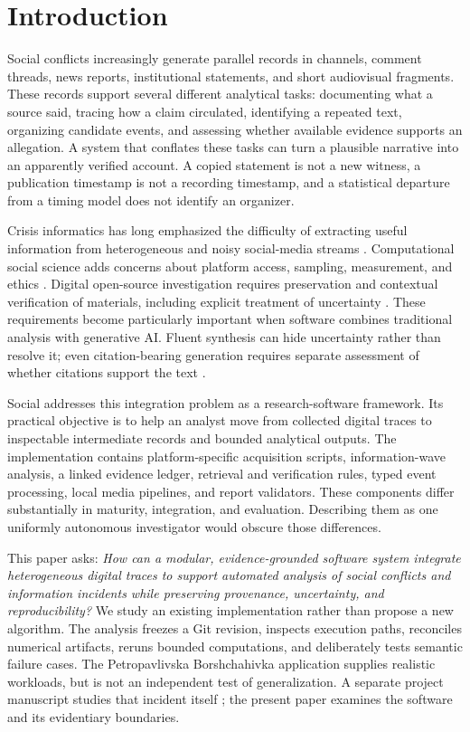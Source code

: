 \section{Introduction}
Social conflicts increasingly generate parallel records in channels, comment threads, news reports, institutional statements, and short audiovisual fragments. These records support several different analytical tasks: documenting what a source said, tracing how a claim circulated, identifying a repeated text, organizing candidate events, and assessing whether available evidence supports an allegation. A system that conflates these tasks can turn a plausible narrative into an apparently verified account. A copied statement is not a new witness, a publication timestamp is not a recording timestamp, and a statistical departure from a timing model does not identify an organizer.

Crisis informatics has long emphasized the difficulty of extracting useful information from heterogeneous and noisy social-media streams \citep{imran2015crisis}. Computational social science adds concerns about platform access, sampling, measurement, and ethics \citep{Olteanu2019,VicentePaula2023}. Digital open-source investigation requires preservation and contextual verification of materials, including explicit treatment of uncertainty \citep{berkeleyProtocol2022}. These requirements become particularly important when software combines traditional analysis with generative AI. Fluent synthesis can hide uncertainty rather than resolve it; even citation-bearing generation requires separate assessment of whether citations support the text \citep{gao2023alce}.

Social addresses this integration problem as a research-software framework. Its practical objective is to help an analyst move from collected digital traces to inspectable intermediate records and bounded analytical outputs. The implementation contains platform-specific acquisition scripts, information-wave analysis, a linked evidence ledger, retrieval and verification rules, typed event processing, local media pipelines, and report validators. These components differ substantially in maturity, integration, and evaluation. Describing them as one uniformly autonomous investigator would obscure those differences.

This paper asks: \emph{How can a modular, evidence-grounded software system integrate heterogeneous digital traces to support automated analysis of social conflicts and information incidents while preserving provenance, uncertainty, and reproducibility?} We study an existing implementation rather than propose a new algorithm. The analysis freezes a Git revision, inspects execution paths, reconciles numerical artifacts, reruns bounded computations, and deliberately tests semantic failure cases. The Petropavlivska Borshchahivka application supplies realistic workloads, but is not an independent test of generalization. A separate project manuscript studies that incident itself \citep{pylypenko2026case}; the present paper examines the software and its evidentiary boundaries.

